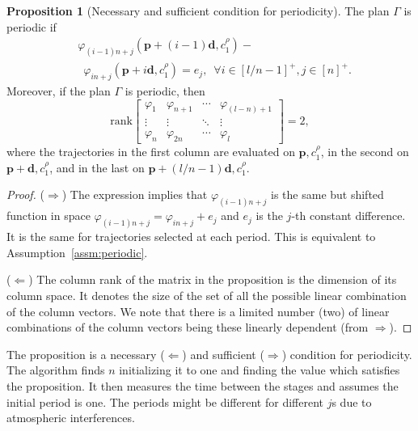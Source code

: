 \documentclass[letterpaper,10pt,conference]{ieeeconf}
\theoremstyle{definition}
\newtheorem{prop}[thm]{Proposition}
\begin{document}
\begin{prop}[Necessary and sufficient condition for periodicity]\label{prop:rank}
  The plan $\Gamma$ is periodic if
  \begin{equation*}\begin{split}
    &\varphi_{(i-1)n+j}(\mathbf{p}+(i-1)\mathbf{d},c_1^\rho)-\\ &\,\,\,\varphi_{in+j}(\mathbf{p}+i\mathbf{d},c_1^\rho)=e_j,\,\,\,\forall i\in[l/n-1]^+,j\in[n]^+.
  \end{split}\end{equation*}
  Moreover, if the plan $\Gamma$ is periodic, then
  \begin{equation*}
    \mathrm{rank}\begin{bmatrix}
        \varphi_1 & \varphi_{n+1} & \cdots & \varphi_{(l-n)+1} \\ 
        \vdots & \vdots & \ddots & \vdots \\
        \varphi_n & \varphi_{2n} & \cdots & \varphi_l   
      \end{bmatrix}=2,
  \end{equation*}
  where the trajectories in the first column are evaluated on $\mathbf{p},c_1^\rho$, in the second on $\mathbf{p}+\mathbf{d},c_1^\rho$, and in the last on $\mathbf{p}+(l/n-1)\mathbf{d},c_1^\rho$.
\end{prop}
\begin{proof}($\Longrightarrow$) The expression implies that $\varphi_{(i-1)n+j}$ is the same but shifted function in space $\varphi_{(i-1)n+j}=\varphi_{in+j}+e_j$ and $e_j$ is the $j$-th constant difference. It is the same for trajectories selected at each period. This is equivalent to Assumption~\ref{assm:periodic}.
  
($\Longleftarrow$) The column rank of the matrix in the proposition is the dimension of its column space. It denotes the size of the set of all the possible linear combination of the column vectors. We note that there is a limited number (two) of linear combinations of the column vectors being these linearly dependent (from $\Longrightarrow$). 
\end{proof}

The proposition is a necessary ($\Longleftarrow$) and sufficient ($\Longrightarrow$) condition for periodicity. The algorithm finds $n$ initializing it to one and finding the value which satisfies the proposition. It then measures the time between the stages and assumes the initial period is one. The periods might be different for different $j$s due to atmospheric interferences.
\end{document}
